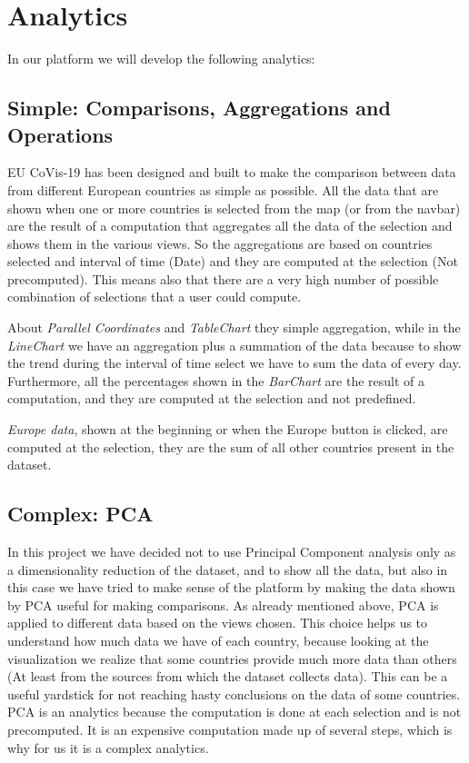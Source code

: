 \documentclass[10pt,conference]{IEEEtran}
\begin{document}
\section{Analytics}
In our platform we will develop the following analytics:
\subsection{Simple: Comparisons, Aggregations and Operations} 
EU CoVis-19 has been designed and built to make the comparison between data from different European countries as simple as possible. All the data that are shown when one or more countries is selected from the map (or from the navbar) are the result of a computation that aggregates all the data of the selection and shows them in the various views.
So the aggregations are based on countries selected and interval of time (Date) and they are computed at the selection (Not precomputed). This means also that there are a very high number of possible combination of selections that a user could compute. 

About {\em Parallel Coordinates} and {\em TableChart} they simple aggregation, while in the {\em LineChart} we have an aggregation plus a summation of the data because to show the trend during the interval of time select we have to sum the data of every day. Furthermore, all the percentages shown in the {\em BarChart} are the result of a computation, and they are computed at the selection and not predefined.

{\em Europe data}, shown at the beginning or when the Europe button is clicked, are computed at the selection, they are the sum of all other countries present in the dataset.

\subsection{Complex: PCA}
In this project we have decided not to use Principal Component analysis only as a dimensionality reduction of the dataset, and to show all the data, but also in this case we have tried to make sense of the platform by making the data shown by PCA useful for making comparisons. As already mentioned above, PCA is applied to different data based on the views chosen. This choice helps us to understand how much data we have of each country, because looking at the visualization we realize that some countries provide much more data than others (At least from the sources from which the dataset collects data). This can be a useful yardstick for not reaching hasty conclusions on the data of some countries. PCA is an analytics because the computation is done at each selection and is not precomputed. It is an expensive computation made up of several steps, which is why for us it is a complex analytics.
\end{document}
